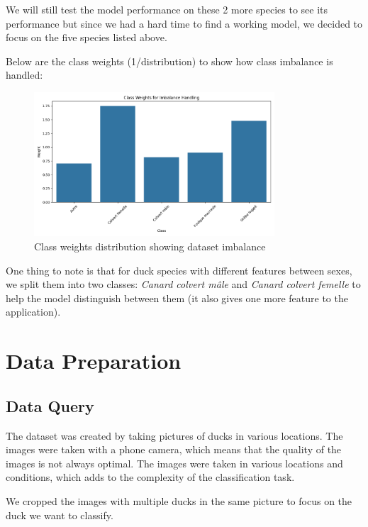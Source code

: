 \documentclass[12pt,a4paper]{article}
\begin{document}
We will still test the model performance on these 2 more species to see its performance but since we had a hard time to find a working model, we decided to focus on the five species listed above.

Below are the class weights (1/distribution) to show how class imbalance is handled:

\begin{figure}[H]
    \centering
    \includegraphics[width=0.8\textwidth]{../../output/best_model_duck_classification_f1_optimized_20250608_195712/plots/class_weights.png}
    \caption{Class weights distribution showing dataset imbalance}
    \label{fig:class_weights}
\end{figure}

One thing to note is that for duck species with different features between sexes, we split them into two classes: \textit{Canard colvert mâle} and \textit{Canard colvert femelle} to help the model distinguish between them (it also gives one more feature to the application).

\section{Data Preparation}

\subsection{Data Query}

The dataset was created by taking pictures of ducks in various locations. The images were taken with a phone camera, which means that the quality of the images is not always optimal. The images were taken in various locations and conditions, which adds to the complexity of the classification task.

We cropped the images with multiple ducks in the same picture to focus on the duck we want to classify.
\end{document}

